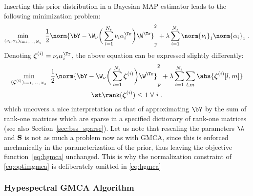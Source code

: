 Inserting this prior distribution in a Bayesian MAP estimator leads to the following minimization problem:
\begin{equation}
\label{eq:hgmca}
\min_{(\nu_i,\alpha_i)_{i=1,\cdots,N_s}} ~ \frac{1}{2}\norm{{\bY} -  \W_\nu\bigg(\sum_{i=1}^{N_s} {\nu}_i{\alpha}_i^\Tr\bigg)\W^\Tr}_\mathrm{F}^2   +   \lambda \sum_{i=1}^{N_s}    \norm{\nu_i}_1 \norm{\alpha_i}_1  ~ . 
\end{equation}
Denoting ${\boldsymbol \zeta}^{(i)} = \nu_i \alpha_i^\Tr$, the above equation can be expressed slightly differently:
\begin{multline}
\min_{({\boldsymbol \zeta}^{(i)})_{i=1,\cdots,N_s}} ~ \frac{1}{2}\norm{{\bY} -  \W_\nu\bigg(\sum_{i=1}^{N_s} {\boldsymbol \zeta}^{(i)}\bigg)\W^\Tr}_\mathrm{F}^2   +   \lambda \sum_{i=1}^{N_s} \sum_{l,m}\abs{{\boldsymbol \zeta}^{(i)}[l,m]}  \\ \st \rank({\boldsymbol \zeta}^{(i)}) \leq 1 ~ \forall ~ i ~ .
\end{multline} 
which uncovers a nice interpretation as that of approximating $\bY$ by the sum of rank-one matrices which are sparse in a specified dictionary of rank-one matrices (see also Section~\ref{sec:bss_sparse}). Let us note that rescaling the parameters $\A$ and $\bf S$ is not as much a problem now as with GMCA, since 
this is enforced mechanically in the parameterization of the prior, thus leaving the objective function~\eqref{eq:hgmca} unchanged. This is why the normalization constraint of \eqref{eq:optimgmca} is deliberately omitted in \eqref{eq:hgmca}



\subsubsection{Hypespectral GMCA Algorithm}
 
